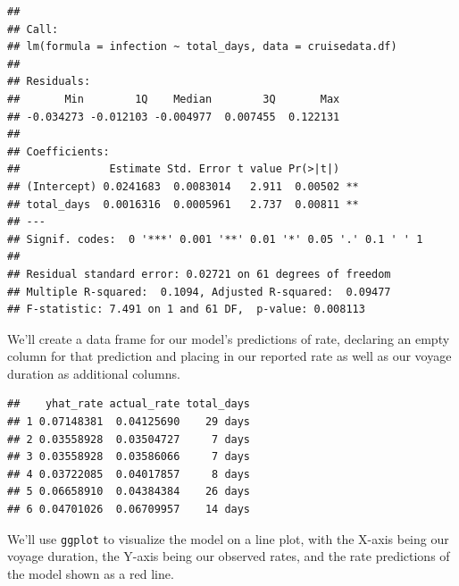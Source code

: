 \documentclass[
  11,
]{book}
\newenvironment{Shaded}{\begin{snugshade}}{\end{snugshade}}
\newcommand{\AttributeTok}[1]{\textcolor[rgb]{0.27,0.27,0.27}{#1}}
\newcommand{\CommentTok}[1]{\textcolor[rgb]{0.37,0.37,0.37}{\textit{#1}}}
\newcommand{\ConstantTok}[1]{\textcolor[rgb]{0.37,0.37,0.37}{#1}}
\newcommand{\FunctionTok}[1]{\textcolor[rgb]{0.27,0.27,0.27}{\textbf{#1}}}
\newcommand{\NormalTok}[1]{#1}
\newcommand{\OtherTok}[1]{\textcolor[rgb]{0.37,0.37,0.37}{#1}}
\newcommand{\SpecialCharTok}[1]{\textcolor[rgb]{0.43,0.43,0.43}{\textbf{#1}}}
\begin{document}
\begin{verbatim}
## 
## Call:
## lm(formula = infection ~ total_days, data = cruisedata.df)
## 
## Residuals:
##       Min        1Q    Median        3Q       Max 
## -0.034273 -0.012103 -0.004977  0.007455  0.122131 
## 
## Coefficients:
##              Estimate Std. Error t value Pr(>|t|)   
## (Intercept) 0.0241683  0.0083014   2.911  0.00502 **
## total_days  0.0016316  0.0005961   2.737  0.00811 **
## ---
## Signif. codes:  0 '***' 0.001 '**' 0.01 '*' 0.05 '.' 0.1 ' ' 1
## 
## Residual standard error: 0.02721 on 61 degrees of freedom
## Multiple R-squared:  0.1094, Adjusted R-squared:  0.09477 
## F-statistic: 7.491 on 1 and 61 DF,  p-value: 0.008113
\end{verbatim}

We'll create a data frame for our model's predictions of rate, declaring an empty column for that prediction and placing in our reported rate as well as our voyage duration as additional columns.

\begin{Shaded}
\end{Shaded}

\begin{verbatim}
##    yhat_rate actual_rate total_days
## 1 0.07148381  0.04125690    29 days
## 2 0.03558928  0.03504727     7 days
## 3 0.03558928  0.03586066     7 days
## 4 0.03722085  0.04017857     8 days
## 5 0.06658910  0.04384384    26 days
## 6 0.04701026  0.06709957    14 days
\end{verbatim}

We'll use \texttt{ggplot} to visualize the model on a line plot, with the X-axis being our voyage duration, the Y-axis being our observed rates, and the rate predictions of the model shown as a red line.
\end{document}
